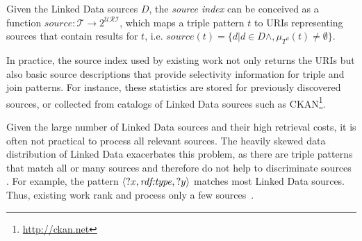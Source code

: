 \begin{definition}
  \label{def:index}
  Given the Linked Data sources $D$, the \emph{source index} can be
  conceived as a function $source : \mathcal{T} \to 2^\mathcal{URI}$,
  which maps a triple pattern $t$ to URIs representing sources that
  contain results for $t$, i.e. $source(t) = \{d| d \in D \wedge,
  \mu_{T^d}(t) \neq \emptyset \}$.
\end{definition}
%

In practice, the source index used by existing work not only returns the URIs but also basic source descriptions that provide selectivity information for triple and join patterns. For instance, these statistics are stored for previously discovered sources, or collected from catalogs of Linked Data sources such as CKAN\footnote{\url{http://ckan.net}}.

Given the large number of Linked Data sources and their high retrieval costs, it is often not practical to process all relevant sources. The heavily skewed data
distribution of Linked Data exacerbates this problem, as there are
triple patterns that match all or many sources and therefore do not
help to discriminate sources \cite{ladwig_linked_2010}. For example, 
the pattern $\langle ?x, \mbox{\emph{rdf:type}}, ?y \rangle$ matches most Linked Data sources. Thus, existing work rank and process only a few sources~\cite{harth_data_2010,ladwig_linked_2010}.



